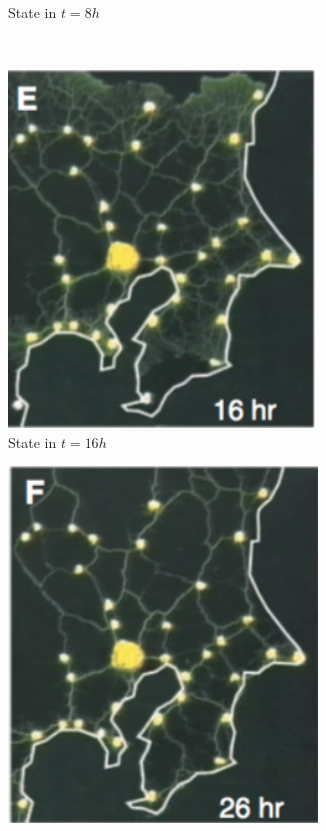 \documentclass[english,a4paper,twoside]{ppfcmthesis}
\begin{document}
\begin{figure}
\begin{subfigure}{0.33\textwidth}
    \caption{State in $t=8h$}
    \label{figure:bp_network_intermediate_a}
  \end{subfigure}
  \\
  \begin{subfigure}{0.33\textwidth}
    \centering
    \includegraphics[width=0.9\textwidth]{background/physarum/network_intermediate_b.jpg}
    \caption{State in $t=16h$}
    \label{figure:bp_network_intermediate_b}
  \end{subfigure}
  \begin{subfigure}{0.33\textwidth}
    \centering
    \includegraphics[width=0.9\textwidth]{background/physarum/network_final.jpg}

\end{subfigure}
\end{figure}
\end{document}
